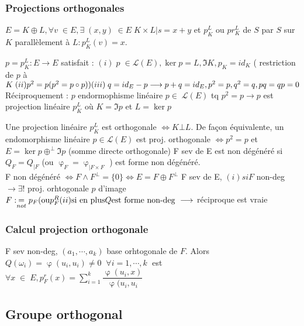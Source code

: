 \documentclass[11pt]{article} %
\begin{document}
\newpage

\subsubsection{Projections orthogonales}
 $ E = K \oplus L, \forall v \; \in E, \exists \! \; (x,y) \; \in E \; K \times L | s=x+y$ et  $  p_{K}^{L} $ ou $ pr_{K}^{L}$ de $S$ par $S$ sur $K$ parallèlement à $L: p_{K}^{L}(v)=x$.

\proposition $ p=p_{K}^{L}:E \longrightarrow E $ satisfait : $ (i) \; p \; \in \mathcal{L}(E), \ker p = L, \Im K, p_{K}= id_K$ ( restriction de $p$ à $K \; (ii) p^2= p (p^2=p \circ p)) \\ (iii) \; q=id_{E} - p \longrightarrow p+q = id_{E}, p^2=p,q^2=q,pq=qp=0 \\ $ Réciproquement : $p$ endormophisme linéaire $  p \in \; \mathcal{L}(E)  $ tq $p^2=p \longrightarrow p$ est projection linéaire $ p_{K}^{L} $ où $K= \Im p $ et $ L= \ker p$

 Une projection linéaire $p_{K}^{L} $ est orthogonale $\iff K \bot L$. De façon équivalente, un endomorphisme linéaire $p \in \mathcal{L}(E)$ est proj. orthogonale $ \iff p^2=p$ et $ E= \ker p \oplus^{\bot} \Im p$ (somme directe orthogonale)
 F sev de E est non dégénéré si $Q_F = Q_{|F} $ (ou $ \upvarphi_F = \upvarphi_{|F \times F}$ ) est forme non dégénéré. \\ F non dégénéré $ \iff F \wedge F^{\bot}= \{ 0 \} \iff E = F \oplus F^{\bot}$
\proposition F sev de E, $(i)  si F $ non-deg $ \longrightarrow \exists ! $ proj. orhtogonale $ p $ d'image $F : \underset{not}{=} p_F (  \text{ou} p_{F}^{R} \\ (ii) \text{si en plus} Q \text{est forme non-deg } \longrightarrow  $ réciproque est vraie
\subsubsection{Calcul projection orthogonale }
\proposition F sev non-deg, $ (a_1, \cdots, a_k) $ base orhtogonale de $F$. Alors $Q(\omega_i)= \upvarphi(u_i,u_i) \neq 0 \; \; \forall i=1, \cdots , k \;$ est $ \forall x \; \in \; E, p_{F}^{r}(x)= \sum_{i=1}^{k} \dfrac{\upvarphi(u_i,x)}{\upvarphi (u_i,u_i}$

\subsection{Groupe orthogonal}
\end{document}
